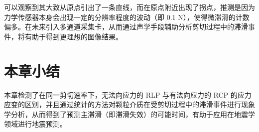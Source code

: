 可以观察到其大致从原点引出了一条直线，而在原点附近出现了拐点，推测是因为力学传感器本身会出现一定的分辨率程度的波动（即 0.1 \unit{\newton}），使得微滞滑的计数偏多。在未来引入多通道采集卡，从而通过声学手段辅助分析剪切过程中的滞滑事件，将有助于得到更理想的图像结果。

\section{本章小结}

本章检测了在同一剪切速率下，无法向应力的 RLP 与有法向应力的 RCP 的应力应变的区别，并且通过统计的方法对颗粒介质在受剪切过程中的滞滑事件进行现象学分析，从而得到了预测主滞滑（即滞滑失效）的可能时间，有助于应用在地震学领域进行地震预测。